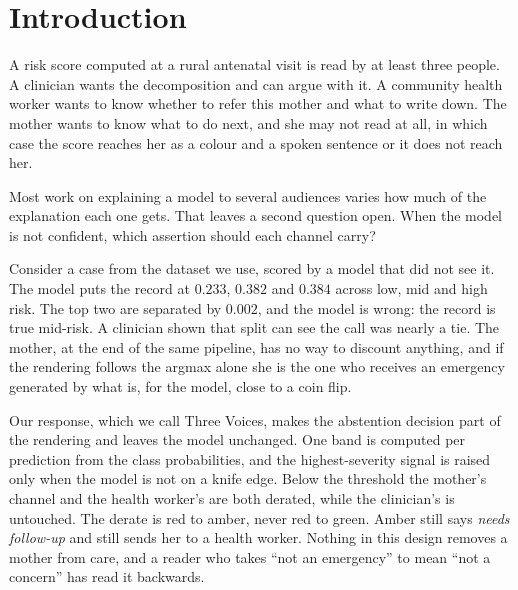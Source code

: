 \section{Introduction}
\label{sec:intro}

A risk score computed at a rural antenatal visit is read by at least three
people. A clinician wants the decomposition and can argue with it. A
community health worker wants to know whether to refer this mother and what
to write down. The mother wants to know what to do next, and she may not read
at all, in which case the score reaches her as a colour and a spoken sentence
or it does not reach her.

Most work on explaining a model to several audiences varies how much of the
explanation each one gets. That leaves a second question open. When the model
is not confident, which assertion should each channel carry?

Consider a case from the dataset we use, scored by a model that did not see
it. The model puts the record at $0.233$, $0.382$ and $0.384$ across low, mid
and high risk. The top two are separated by $0.002$, and the model is wrong:
the record is true mid-risk. A clinician shown that split can see the call was
nearly a tie. The mother, at the end of the same pipeline, has no way to
discount anything, and if the rendering follows the argmax alone she is the
one who receives an emergency generated by what is, for the model, close to a
coin flip.

Our response, which we call Three Voices, makes the abstention decision part
of the rendering and leaves the model unchanged. One band is computed per
prediction from the class probabilities, and the highest-severity signal is
raised only when the model is not on a knife edge. Below the threshold the
mother's channel and the health worker's are both derated, while the
clinician's is untouched. The derate is red to amber, never
red to green. Amber still says \emph{needs follow-up} and still sends her to
a health worker. Nothing in this design removes a mother from care, and a
reader who takes ``not an emergency'' to mean ``not a concern'' has read it
backwards.

